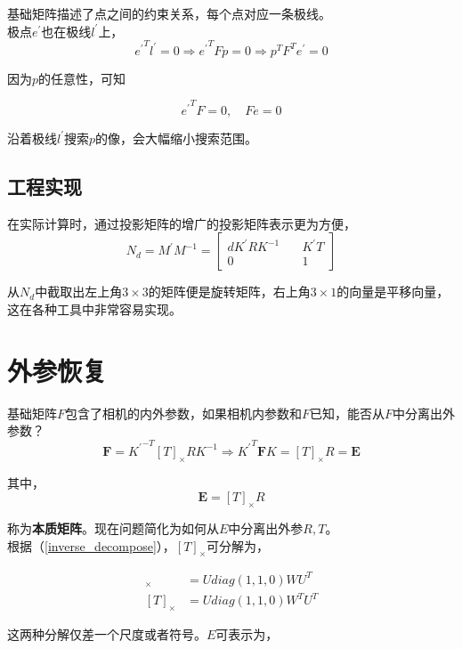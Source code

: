 	基础矩阵描述了点之间的约束关系，每个点对应一条极线。\\

	极点$e^\prime$也在极线$l^\prime$上，
	$$
		{e^\prime}^T l^\prime = 0 \Rightarrow {e^\prime}^TFp=0 \Rightarrow p^T F^T e^\prime = 0
	$$

	因为$p$的任意性，可知

	$$
		{e^\prime}^T F = 0, \quad Fe = 0
	$$

	沿着极线$l^\prime$搜索$p$的像，会大幅缩小搜索范围。

	\subsection*{工程实现}
		在实际计算时，通过投影矩阵的增广的投影矩阵表示更为方便，
		\begin{equation}
			N_d= M^{\prime}M^{-1} = \begin{bmatrix}
				dK^\prime R K^{-1} \quad& K^\prime T\\
				0\quad& 1\quad
			\end{bmatrix}\label{extend_f}		
		\end{equation}

		从$N_d$中截取出左上角$3\times 3$的矩阵便是旋转矩阵，右上角$3\times 1$的向量是平移向量，这在各种工具中非常容易实现。

\section{外参恢复}\label{section_recovery_outer_p}
	基础矩阵$F$包含了相机的内外参数，如果相机内参数和$F$已知，能否从$F$中分离出外参数？\\

	$$
		\mathbf{F} = {K^{\prime}}^{-T}[T]_{\times}RK^{-1} \Rightarrow {K^{\prime}}^{T}\mathbf{F} K = [T]_{\times}R = \mathbf{E}
	$$

	其中，
	$$
		\mathbf{E} = [T]_{\times}R
	$$

	称为\textbf{本质矩阵}。现在问题简化为如何从$E$中分离出外参$R,T$。\\

	根据（\ref{inverse_decompose}），$[T]_{\times}$可分解为，

	\begin{align*}
		[T]_{\times} &= U diag(1,1,0)WU^T\\
		[T]_{\times} &= U diag(1,1,0)W^TU^T
	\end{align*}

	这两种分解仅差一个尺度或者符号。$E$可表示为，

